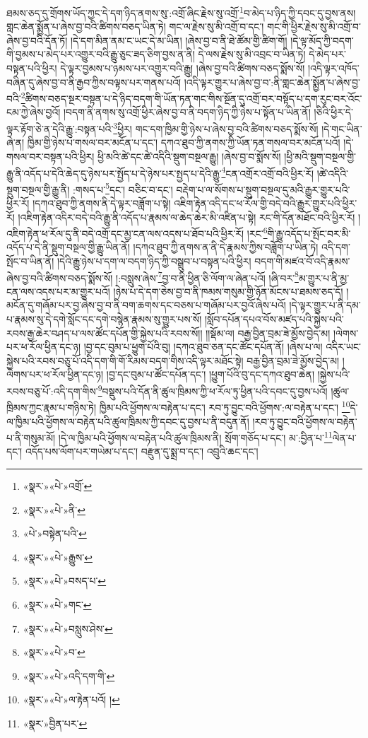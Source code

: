 ཐམས་ཅད་དུ་གྲོགས་ཡོད་ཀྱང་དེ་དག་ཉིད་ནགས་སུ་:འགྲོ་ཞིང་རྗེས་སུ་འགྲོ་\footnote{«སྣར་»«པེ་»འགྲོ་}བ་མེད་པ་ཉིད་ཀྱི་དབང་དུ་བྱས་ནས། གླང་ཆེན་སྨྱོན་པ་ཞེས་བྱ་བའི་ཚིགས་བཅད་ཡིན་ཏེ། གང་ལ་རྗེས་སུ་མི་འགྲོ་བ་དང་། གང་གི་ཕྱིར་རྗེས་སུ་མི་འགྲོ་བ་ཞེས་བྱ་བའི་དོན་ཏོ། །དེ་དག་མིན་ནམ་ང་ཡང་དེ་མ་ཡིན། །ཞེས་བྱ་བ་ནི་ཐེ་ཚོམ་གྱི་ཚིག་གོ། །དེ་ལྟ་མོད་ཀྱི་བདག་གི་བྱམས་པ་མེད་པར་འགྱུར་བའི་རྒྱུ་ཅུང་ཟད་ཅིག་བྱས་ན་ནི། དེ་ལས་རྗེས་སུ་མི་འབྲང་བ་ཡིན་ཏེ། དེ་མེད་པར་བསྟན་པའི་ཕྱིར། དེ་ལྟར་བྱམས་པ་ཉམས་པར་འགྱུར་བའི་རྒྱུ། །ཞེས་བྱ་བའི་ཚིགས་བཅད་སྨོས་སོ། །འདི་ལྟར་འཁོད་བཞིན་དུ་ཞེས་བྱ་བ་ནི་རྒྱབ་ཀྱིས་བལྟས་པར་གནས་པའོ། །འདི་ལྟར་གྱུར་པ་ཞེས་བྱ་བ་:ནི་གླང་ཆེན་སྨྱོན་པ་ཞེས་བྱ་བའི་\footnote{«སྣར་»«པེ་»ནི་}ཚིགས་བཅད་སྔར་བསྟན་པ་དེ་ཉིད་བདག་གི་ཡོན་ཏན་གང་གིས་སྔོན་དུ་འགྲོ་བར་བསྟོད་པ་དག་རུང་བར་འོང་ངམ་ཀྱེ་ཞེས་བྱའོ། །བདག་ནི་ནགས་སུ་འགྲོ་ཕྱིར་ཞེས་བྱ་བ་ནི་བདག་ཉིད་ཀྱི་ཉེས་པ་སྟོན་པ་ཡིན་ནོ། །ཅིའི་ཕྱིར་དེ་ལྟར་རྟོག་ཅེ་ན་དེའི་རྒྱུ་:བསྟན་པའི་\footnote{«པེ་»བསྟེན་པའི་}ཕྱིར། གང་དག་ཁྱིམ་གྱི་ཉེས་པ་ཞེས་བྱ་བའི་ཚིགས་བཅད་སྨོས་སོ། །དེ་གང་ཡིན་ཞེ་ན། ཁྱིམ་གྱི་ཉེས་པ་གསལ་བར་མངོན་པ་དང་། དཀའ་ཐུབ་ཀྱི་ནགས་ཀྱི་ཡོན་ཏན་གསལ་བར་མངོན་པའོ། །དེ་གསལ་བར་བསྟན་པའི་ཕྱིར། ཕྱི་མའི་ཚེ་དང་ཚེ་འདིའི་སྡུག་བསྔལ་རྒྱུ། །ཞེས་བྱ་བ་སྨོས་སོ། །ཕྱི་མའི་སྡུག་བསྔལ་གྱི་རྒྱུ་ནི་འདོད་པ་དེའི་ཆེད་དུ་ཉེས་པར་སྤྱོད་པ་དེ་ཉེས་པར་སྤྱད་པ་དེའི་རྒྱུ་\footnote{«སྣར་»«པེ་»རྒྱུས་}ངན་འགྲོར་འགྲོ་བའི་ཕྱིར་རོ། །ཚེ་འདིའི་སྡུག་བསྔལ་གྱི་རྒྱུ་ནི། :གསད་པ་\footnote{«སྣར་»«པེ་»བསད་པ་}དང་། བཅིང་བ་དང་། བརྡེག་པ་ལ་སོགས་པ་སྡུག་བསྔལ་དུ་མའི་རྒྱུར་གྱུར་པའི་ཕྱིར་རོ། །དཀའ་ཐུབ་ཀྱི་ནགས་ནི་དེ་ལྟར་བཟློག་པ་སྟེ། འཇིག་རྟེན་འདི་དང་ཕ་རོལ་གྱི་བདེ་བའི་རྒྱུར་གྱུར་པའི་ཕྱིར་རོ། །འཇིག་རྟེན་འདིར་བདེ་བའི་རྒྱུ་ནི་འདོད་པ་རྣམས་ལ་ཆེད་ཆེར་མི་འཛིན་པ་སྟེ། རང་གི་དོན་མཐོང་བའི་ཕྱིར་རོ། །འཇིག་རྟེན་ཕ་རོལ་དུ་ནི་བདེ་འགྲོ་དང་མྱ་ངན་ལས་འདས་པ་ཐོབ་པའི་ཕྱིར་རོ། །རང་\footnote{«སྣར་»«པེ་»གང་}གི་རྒྱུ་འདོད་པ་སྤོང་བར་མི་འདོད་པ་དེ་ནི་སྡུག་བསྔལ་གྱི་རྒྱུ་ཡིན་ནོ། །དཀའ་ཐུབ་ཀྱི་ནགས་ན་ནི་དེ་རྣམས་ཀྱིས་བཟློག་པ་ཡིན་ཏེ། འདི་དག་སྤོང་བ་ཡིན་ནོ། །དེའི་རྒྱུ་ཉེས་པ་དག་ལ་བདག་ཉིད་ཀྱི་བསྒྲུབ་པ་བསྟན་པའི་ཕྱིར། བདག་གི་མཛའ་བོ་འདི་རྣམས་ཞེས་བྱ་བའི་ཚིགས་བཅད་སྨོས་སོ། །:བསླུས་ཞེས་\footnote{«སྣར་»«པེ་»བསླུས་ཤེས་}བྱ་བ་ནི་ཕྱིན་ཅི་ལོག་ལ་ཞེན་པའོ། །ཞི་བར་\footnote{«སྣར་»«པེ་»བ་}མ་གྱུར་པ་ནི་མྱ་ངན་ལས་འདས་པར་མ་གྱུར་པའོ། །ཉེས་པ་དེ་དག་ཅེས་བྱ་བ་ནི་ཁམས་གསུམ་གྱི་ཉོན་མོངས་པ་ཐམས་ཅད་དོ། །མངོན་དུ་གཞོམ་པར་བྱ་ཞེས་བྱ་བ་ནི་བག་ཆགས་དང་བཅས་པ་གཞོམ་པར་བྱའོ་ཞེས་པའོ། །དེ་ལྟར་གྱུར་པ་ནི་དམ་པ་རྣམས་སུ་དེ་དགེ་སློང་དང་དགེ་བསྙེན་རྣམས་སུ་གྱུར་པས་སོ། །སློབ་དཔོན་དཔའ་བོས་མཛད་པའི་སྐྱེས་པའི་རབས་རྒྱ་ཆེར་བཤད་པ་ལས་ཚོང་དཔོན་གྱི་སྐྱེས་པའི་རབས་སོ།། །།སྡོམ་ལ། བརྒྱ་བྱིན་བྲམ་ཟེ་མྱོས་བྱེད་མ། །ལེགས་པར་ཕ་རོལ་ཕྱིན་དང་ཉ། །བྱ་དང་བུམ་པ་ཕྱུག་པོའི་བུ། །དཀའ་ཐུབ་ཅན་དང་ཚོང་དཔོན་ནོ། །ཞེས་པ་ལ། འདིར་ཡང་སྐྱེས་པའི་རབས་བཅུ་པོ་འདི་དག་གི་གོ་རིམས་བདག་གིས་འདི་ལྟར་མཐོང་སྟེ། བརྒྱ་བྱིན་བྲམ་ཟེ་མྱོས་བྱེད་མ། །ལེགས་པར་ཕ་རོལ་ཕྱིན་དང་ཉ། །བྱ་དང་བུམ་པ་ཚོང་དཔོན་དང་། །ཕྱུག་པོའི་བུ་དང་དཀའ་ཐུབ་ཆེན། །སྐྱེས་པའི་རབས་བཅུ་པོ་:འདི་དག་གིས་\footnote{«སྣར་»«པེ་»འདི་དག་གི་}བསྡུས་པའི་དོན་ནི་ཚུལ་ཁྲིམས་ཀྱི་ཕ་རོལ་ཏུ་ཕྱིན་པའི་དབང་དུ་བྱས་པའོ། །ཚུལ་ཁྲིམས་ཀྱང་རྣམ་པ་གཉིས་ཏེ། ཁྱིམ་པའི་ཕྱོགས་ལ་བརྟེན་པ་དང་། རབ་ཏུ་བྱུང་བའི་ཕྱོགས་:ལ་བརྟེན་པ་དང་། \footnote{«སྣར་»«པེ་»ལ་རྟེན་པའོ། ། }དེ་ལ་ཁྱིམ་པའི་ཕྱོགས་ལ་བརྟེན་པའི་ཚུལ་ཁྲིམས་ཀྱི་དབང་དུ་བྱས་པ་ནི་བདུན་ནོ། །རབ་ཏུ་བྱུང་བའི་ཕྱོགས་ལ་བརྟེན་པ་ནི་གསུམ་མོ། །དེ་ལ་ཁྱིམ་པའི་ཕྱོགས་ལ་བརྟེན་པའི་ཚུལ་ཁྲིམས་ནི། སྲོག་གཅོད་པ་དང་། མ་:བྱིན་པ་\footnote{«སྣར་»བྱིན་པར་}ལེན་པ་དང་། འདོད་པས་ལོག་པར་གཡེམ་པ་དང་། བརྫུན་དུ་སྨྲ་བ་དང་། འབྲུའི་ཆང་དང་། 